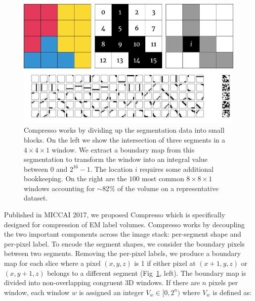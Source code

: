 \begin{figure}[t]
	\begin{center}
		\begin{minipage}{0.45\linewidth}
			\centering
			\includegraphics[width=\linewidth]{./figures/encoding_diagram_opt.pdf}
		\end{minipage}
		\hspace{0.08\linewidth}
		\begin{minipage}{0.45\linewidth}
			\centering
			\includegraphics[width=\linewidth]{./figures/window_values.pdf}
		\end{minipage}
	\end{center}	
	\caption{Compresso works by dividing up the segmentation data into small blocks. On the left we show the intersection of three segments in a $4\times4\times1$ window. We extract a boundary map from this segmentation to transform the window into an integral value between $0$ and $2^{16} - 1$. The location $i$ requires some additional bookkeeping. On the right are the $100$ most common $8 \times 8 \times 1$ windows accounting for $\sim82\%$ of the volume on a representative dataset.}
	\label{fig:compression}
\end{figure}


Published in MICCAI 2017, we proposed Compresso which is specifically designed for compression of EM label volumes.
Compresso works by decoupling the two important components across the image stack: per-segment shape and per-pixel label.
To encode the segment shapes, we consider the boundary pixels between two segments. 
Removing the per-pixel labels, we produce a boundary map for each slice where a pixel $(x, y, z)$ is 1 if either pixel at $(x + 1, y, z)$ or $(x, y + 1, z)$ belongs to a different segment (Fig~\ref{fig:compression}, left). 
The boundary map is divided into non-overlapping congruent 3D windows. If there are $n$ pixels per window, each window $w$ is assigned an integer $V_w \in [0, 2^n)$ where $V_w$ is defined as:

